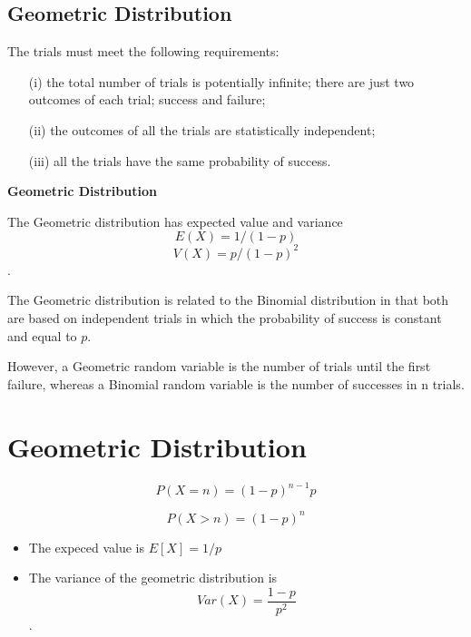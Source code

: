 \documentclass[]{report}
\begin{document}
\subsection{Geometric Distribution}

The trials must meet the following requirements:

\begin{itemize}
\item[(i)] the total number of trials is potentially infinite;
there are just two outcomes of each trial; success and failure;
\item[(ii)] the outcomes of all the trials are statistically independent;
\item[(iii)] all the trials have the same probability of success.
\end{itemize}


\noindent \textbf{Geometric Distribution}

The Geometric distribution has expected value and variance  \[E(X)= 1/(1-p)\] \[V(X)=p/{(1-p)^2}\].

The Geometric distribution is related to the Binomial distribution in that both are based on independent trials in which the probability of success is constant and equal to $p$. 

However, a Geometric random variable is the number of trials until the first failure, whereas a Binomial random variable is the number of successes in n trials.


\section{Geometric Distribution}

\[ P(X = n) = (1-p)^{n-1}p \]

\[ P(X > n) = (1-p)^n \]



\begin{itemize}
\item The expeced value is $ E[X] = 1/p $

\item The variance of the geometric distribution is 
\[Var(X) = \frac{1-p}{p^2}\].

\end{itemize}
\end{document}

